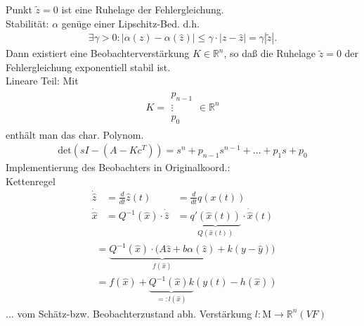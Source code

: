 \documentclass[ngerman]{tudscrreprt}
\begin{document}
Punkt $\tilde z = 0$ ist eine Ruhelage der Fehlergleichung.\\ 
Stabilität: $\alpha$ genüge einer Lipschitz-Bed. d.h. \begin{align*}
\exists \gamma > 0: | \alpha(z) - \alpha(\hat z) | \le \gamma \cdot|z - \hat z| = \gamma |\tilde z|.
\end{align*}
Dann existiert eine Beobachterverstärkung $K \in \mathbb{R}^n$, so daß die Ruhelage $\tilde z = 0$ der Fehlergleichung exponentiell stabil ist. \\ 
Lineare Teil: Mit \begin{align*}
K = \begin{matrix} p_{n-1} \\ \vdots\\ p_0\end{matrix}\in \mathbb{R}^n 
\end{align*}enthält man das char. Polynom.
\begin{align*}
\text{det} (sI - (A - Kc^T)) = s^n + p_{n-1}s^{n-1} + \dots + p_1s + p_0
\end{align*}Implementierung des Beobachters in Originalkoord.: \\ 
Kettenregel \begin{align*}
\dot{\hat z} &= \frac{d}{dt} \hat z(t) &= \frac{d}{dt} q(x(t))\\ \dot{\hat x} &= Q^{-1}(\hat x)\cdot \dot{\hat z} &=\underbrace{ q'(\hat x (t))}_{Q(\hat x(t))} \cdot \dot{\hat x}(t)
\end{align*}\begin{align*}
&= \underbrace{Q^{-1}(\hat x) \cdot (A\hat z + b\alpha(\hat z)}_{f(\hat x)} + k(y - \hat y))\\ 
&= f(\hat x) + \underbrace{Q^{-1}(\hat x) k }_{=: l(\hat x)} (y(t) - h(\hat x))
\end{align*}
$\dots$ vom Schätz-bzw. Beobachterzustand abh. Verstärkung $l : \mathrm{M} \to \mathbb{R}^n (VF)$
\end{document}
